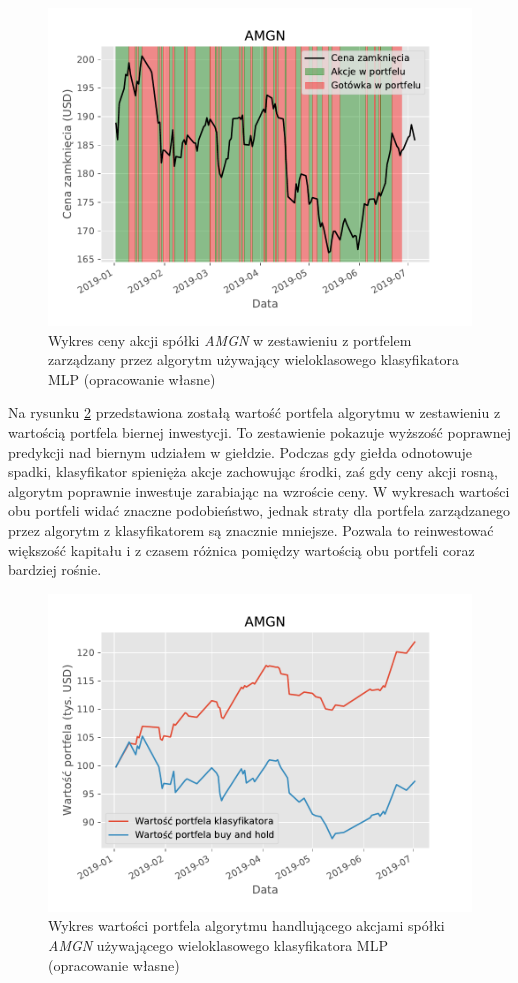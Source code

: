 \documentclass[a4paper, twoside, 11pt, openright]{article}
\begin{document}
\begin{figure}[H]
\centering \includegraphics[scale=1.1]{img/AMGN-buy_and_sell_plot.pdf}
\caption{Wykres ceny akcji spółki \textit{AMGN} w zestawieniu z portfelem zarządzany przez algorytm używający wieloklasowego klasyfikatora MLP (opracowanie własne)}
\label{img:amgn_wallet_buy_sell}
\end{figure}

Na rysunku \ref{img:amgn_wallet_value} przedstawiona zostałą wartość portfela algorytmu w zestawieniu z wartością portfela biernej inwestycji. To zestawienie pokazuje wyższość poprawnej predykcji nad biernym udziałem w giełdzie. Podczas gdy giełda odnotowuje spadki, klasyfikator spienięża akcje zachowując środki, zaś gdy ceny akcji rosną, algorytm poprawnie inwestuje zarabiając na wzroście ceny. W wykresach wartości obu portfeli widać znaczne podobieństwo, jednak straty dla portfela zarządzanego przez algorytm z klasyfikatorem są znacznie mniejsze. Pozwala to reinwestować większość kapitału i z czasem różnica pomiędzy wartością obu portfeli coraz bardziej rośnie.

\begin{figure}[H]
\centering \includegraphics[scale=0.9]{img/AMGN-balance-plot.pdf}
\caption{Wykres wartości portfela algorytmu handlującego akcjami spółki \textit{AMGN} używającego wieloklasowego klasyfikatora MLP (opracowanie własne)}
\label{img:amgn_wallet_value}
\end{figure}
\end{document}
